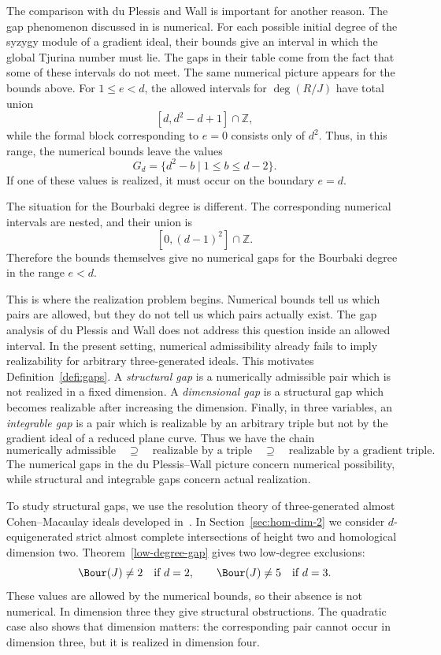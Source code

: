 \documentclass[11pt]{amsart} %
\theoremstyle{definition}
\begin{document}
The comparison with du Plessis and Wall is important for another
reason. The gap phenomenon discussed in
\cite[Section~4]{CTC-Plessis} is numerical. For each possible initial
degree of the syzygy module of a gradient ideal, their bounds give an
interval in which the global Tjurina number must lie. The gaps in their
table come from the fact that some of these intervals do not meet.
The same numerical picture appears for the bounds above. For
$1\le e<d$, the allowed intervals for $\deg(R/J)$ have total union
\[
[d,d^2-d+1]\cap\mathbb Z,
\]
while the formal block corresponding to $e=0$ consists only of $d^2$.
Thus, in this range, the numerical bounds leave the values
\[
G_d=\{d^2-b\mid1\le b\le d-2\}.
\]
If one of these values is realized, it must occur on the boundary
$e=d$.

The situation for the Bourbaki degree is different. The corresponding
numerical intervals are nested, and their union is
\[
[0,(d-1)^2]\cap\mathbb Z.
\]
Therefore the bounds themselves give no numerical gaps for the
Bourbaki degree in the range $e<d$.

This is where the realization problem begins. Numerical bounds tell us
which pairs are allowed, but they do not tell us which pairs actually
exist. The gap analysis of du Plessis and Wall does not address this
question inside an allowed interval. In the present setting, numerical
admissibility already fails to imply realizability for arbitrary
three-generated ideals. This motivates Definition~\ref{defi:gaps}.
A \emph{structural gap} is a numerically admissible pair which is not
realized in a fixed dimension. A \emph{dimensional gap} is a structural
gap which becomes realizable after increasing the dimension. Finally,
in three variables, an \emph{integrable gap} is a pair which is
realizable by an arbitrary triple but not by the gradient ideal of a
reduced plane curve. Thus we have the chain
\[
\text{numerically admissible}
\quad\supseteq\quad
\text{realizable by a triple}
\quad\supseteq\quad
\text{realizable by a gradient triple}.
\]
The numerical gaps in the du Plessis--Wall picture concern numerical
possibility, while structural and integrable gaps concern actual
realization.

To study structural gaps, we use the resolution theory of
three-generated almost Cohen--Macaulay ideals developed in~\cite{BFRS}.
In Section~\ref{sec:hom-dim-2} we consider $d$-equigenerated strict
almost complete intersections of height two and homological dimension
two. Theorem~\ref{low-degree-gap} gives two low-degree exclusions:
\[
\Bour(J)\neq2\quad\text{if }d=2,
\qquad
\Bour(J)\neq5\quad\text{if }d=3.
\]
These values are allowed by the numerical bounds, so their absence is
not numerical. In dimension three they give structural obstructions.
The quadratic case also shows that dimension matters: the corresponding
pair cannot occur in dimension three, but it is realized in dimension
four.
\end{document}
